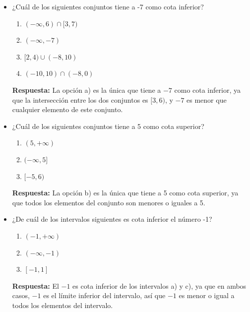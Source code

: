 \documentclass[12pt]{article}
\begin{document}
\begin{itemize}
    \item ¿Cuál de los siguientes conjuntos tiene a -7 como cota inferior? \\
    \begin{enumerate}[label=\alph*)]
        \item $(-\infty, 6) \cap [3, 7)$
        \item $(-\infty, -7)$
        \item $[2, 4) \cup (-8, 10)$
        \item $(-10, 10) \cap (-8, 0)$
    \end{enumerate}

    \textbf{Respuesta:} La opción a) es la única que tiene a $-7$ como cota inferior, 
    ya que la intersección entre los dos conjuntos es $[3, 6)$, y $-7$ es menor que cualquier 
    elemento de este conjunto. \\

    \item ¿Cuál de los siguientes conjuntos tiene a 5 como cota superior? \\
    \begin{enumerate}[label=\alph*)]
        \item $(5, +\infty)$
        \item $(-\infty, 5]$
        \item $[-5, 6)$
    \end{enumerate}

    \textbf{Respuesta:} La opción b) es la única que tiene a 5 como cota superior, 
    ya que todos los elementos del conjunto son menores o iguales a 5. \\

    \item ¿De cuál de los intervalos siguientes es cota inferior el número -1? \\
    \begin{enumerate}[label=\alph*)]
        \item $(-1, +\infty)$
        \item $(-\infty, -1)$
        \item $[-1, 1]$
    \end{enumerate}

    \textbf{Respuesta:} El $-1$ es cota inferior de los intervalos a) y c), 
    ya que en ambos casos, $-1$ es el límite inferior del intervalo, así que
    $-1$ es menor o igual a todos los elementos del intervalo. \\

\end{itemize}
\end{document}
